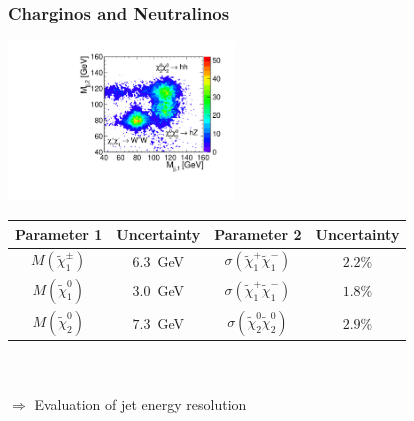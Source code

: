 \documentclass{beamer}
\begin{document}
\begin{frame}
\frametitle{Charginos and Neutralinos}
\centering
\includegraphics[width=6cm]{../WhizardWorkshop/MassPlot2D}\\
{\scriptsize 
\begin{tabular}{c c c c}
       \toprule
       Parameter 1                & Uncertainty &          Parameter 2 & Uncertainty \\
       \midrule
       $M(\tilde{\chi}_{1}^{\pm})$ & $6.3$~GeV & $\sigma(\tilde{\chi}_{1}^{+}\tilde{\chi}_{1}^{-})$  & $2.2$\% \\
       $M(\tilde{\chi}_{1}^{0})$   & $3.0$~GeV & $\sigma(\tilde{\chi}_{1}^{+}\tilde{\chi}_{1}^{-})$  & $1.8$\% \\
       $M(\tilde{\chi}_{2}^{0})$   & $7.3$~GeV & $\sigma(\tilde{\chi}_{2}^{0}\tilde{\chi}_{2}^{0})$  & $2.9$\% \\
\end{tabular}}\\
~\\
$\Rightarrow$ Evaluation of jet energy resolution
\end{frame}
\end{document}
